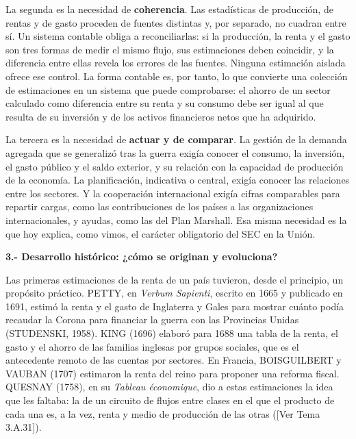 \documentclass[10pt,a4paper]{article}
\newcommand{\authorfont}[1]{{\fontfamily{EBGaramond-TLF}\selectfont #1}}
\begin{document}
La segunda es la necesidad de \textbf{coherencia}. Las estadísticas de producción, de rentas y de gasto proceden de fuentes distintas y, por separado, no cuadran entre sí. Un sistema contable obliga a reconciliarlas: si la producción, la renta y el gasto son tres formas de medir el mismo flujo, sus estimaciones deben coincidir, y la diferencia entre ellas revela los errores de las fuentes. Ninguna estimación aislada ofrece ese control. La forma contable es, por tanto, lo que convierte una colección de estimaciones en un sistema que puede comprobarse: el ahorro de un sector calculado como diferencia entre su renta y su consumo debe ser igual al que resulta de su inversión y de los activos financieros netos que ha adquirido.

La tercera es la necesidad de \textbf{actuar y de comparar}. La gestión de la demanda agregada que se generalizó tras la guerra exigía conocer el consumo, la inversión, el gasto público y el saldo exterior, y su relación con la capacidad de producción de la economía. La planificación, indicativa o central, exigía conocer las relaciones entre los sectores. Y la cooperación internacional exigía cifras comparables para repartir cargas, como las contribuciones de los países a las organizaciones internacionales, y ayudas, como las del Plan Marshall. Esa misma necesidad es la que hoy explica, como vimos, el carácter obligatorio del SEC en la Unión.

\textbf{3.- Desarrollo histórico: ¿cómo se originan y evoluciona?}

Las primeras estimaciones de la renta de un país tuvieron, desde el principio, un propósito práctico. PETTY, en \textit{Verbum Sapienti}, escrito en 1665 y publicado en 1691, estimó la renta y el gasto de Inglaterra y Gales para mostrar cuánto podía recaudar la Corona para financiar la guerra con las Provincias Unidas (STUDENSKI, 1958). KING (1696) elaboró para 1688 una tabla de la renta, el gasto y el ahorro de las familias inglesas por grupos sociales, que es el antecedente remoto de las cuentas por sectores. En Francia, BOISGUILBERT y VAUBAN (1707) estimaron la renta del reino para proponer una reforma fiscal. QUESNAY (1758), en su \textit{Tableau économique}, dio a estas estimaciones la idea que les faltaba: la de un circuito de flujos entre clases en el que el producto de cada una es, a la vez, renta y medio de producción de las otras ([\authorfont{Ver Tema 3.A.31}]).
\end{document}

